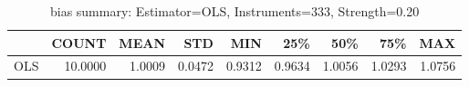 \begin{table}[ht]
\centering
\caption{bias summary: Estimator=OLS, Instruments=333, Strength=0.20}
\begin{tabular}{lrrrrrrrr}
\toprule
 & COUNT & MEAN & STD & MIN & 25\% & 50\% & 75\% & MAX \\
\midrule
OLS & 10.0000 & 1.0009 & 0.0472 & 0.9312 & 0.9634 & 1.0056 & 1.0293 & 1.0756 \\
\bottomrule
\end{tabular}
\end{table}
